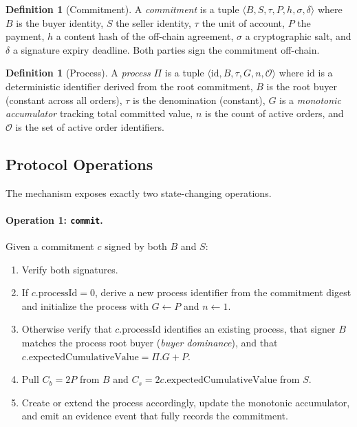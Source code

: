 \documentclass[11pt,a4paper]{article}
\theoremstyle{definition}
\newtheorem{definition}[theorem]{Definition}
\theoremstyle{remark}
\newcommand{\pay}{P}           %
\newcommand{\cumval}{G}        %
\newcommand{\sbond}{C_s}       %
\newcommand{\bbond}{C_b}       %
\begin{document}
\begin{definition}[Commitment]
\label{def:commitment}
A \emph{commitment} is a tuple $\langle B, S, \tau, \pay, h, \sigma,
\delta \rangle$ where $B$ is the buyer identity, $S$ the seller
identity, $\tau$ the unit of account, $\pay$ the payment, $h$ a
content hash of the off-chain agreement, $\sigma$ a cryptographic
salt, and $\delta$ a signature expiry deadline. Both parties sign the
commitment off-chain.
\end{definition}

\begin{definition}[Process]
\label{def:process}
A \emph{process} $\Pi$ is a tuple $\langle \text{id}, B, \tau,
\cumval, n, \mathcal{O} \rangle$ where $\text{id}$ is a deterministic
identifier derived from the root commitment, $B$ is the root buyer
(constant across all orders), $\tau$ is the denomination (constant),
$\cumval$ is a \emph{monotonic accumulator} tracking total committed
value, $n$ is the count of active orders, and $\mathcal{O}$ is the
set of active order identifiers.
\end{definition}

\subsection{Protocol Operations}

The mechanism exposes exactly two state-changing operations.

\paragraph{Operation 1: \texttt{commit}.}
Given a commitment $c$ signed by both $B$ and $S$:
\begin{enumerate}
  \item Verify both signatures.
  \item If $c.\text{processId} = 0$, derive a new process identifier
    from the commitment digest and initialize the process with
    $\cumval \gets \pay$ and $n \gets 1$.
  \item Otherwise verify that $c.\text{processId}$ identifies an
    existing process, that signer $B$ matches the process root buyer
    (\emph{buyer dominance}), and that
    $c.\text{expectedCumulativeValue} = \Pi.\cumval + \pay$.
  \item Pull $\bbond = 2\pay$ from $B$ and
    $\sbond = 2c.\text{expectedCumulativeValue}$ from $S$.
  \item Create or extend the process accordingly, update the monotonic
    accumulator, and emit an evidence event that fully records the
    commitment.
\end{enumerate}
\end{document}
